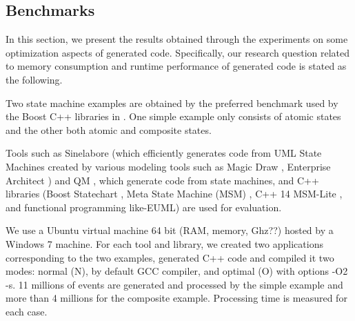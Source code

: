 \subsection{Benchmarks}
\label{subsec:exp2}
In this section, we present the results obtained through the experiments on some optimization aspects of generated code. 
Specifically, our research question related to memory consumption and runtime performance of generated code is stated as the following. 

\noindent
{} 



\noindent
{} Two state machine examples are obtained by the preferred benchmark used by the Boost C++ libraries \cite{boost} in \cite{benchmark}. One simple example \cite{simpleexample} only consists of atomic states and the other \cite{compositeexample} both atomic and composite states. 

Tools such as Sinelabore (which efficiently generates code from UML State Machines created by various modeling tools such as Magic Draw \cite{Magicdraw}, Enterprise Architect \cite{EA}) and QM \cite{QM}, which generate code from state machines, and C++ libraries (Boost Statechart \cite{Statechart}, Meta State Machine (MSM) \cite{MSM}, C++ 14 MSM-Lite \cite{benchmark}, and functional programming like-EUML\cite{EUML}) are used for evaluation. 

\noindent
{} We use a Ubuntu virtual machine 64 bit (RAM, memory, Ghz??) hosted by a Windows 7 machine. 
For each tool and library, we created two applications corresponding to the two examples, generated C++ code and compiled it two modes: normal (N), by default GCC compiler, and optimal (O) with options -O2 -s. 
11 millions of events are generated and processed by the simple example and more than 4 millions for the composite example. 
Processing time is measured for each case. 

